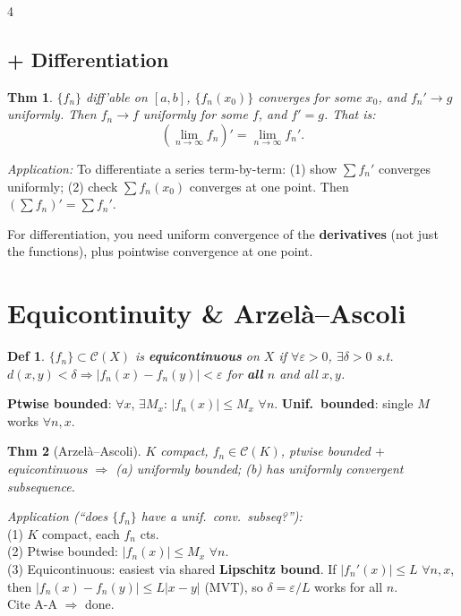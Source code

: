 \documentclass[9pt,landscape]{extarticle}
\newcommand{\eps}{\varepsilon}
\theoremstyle{compact}
\newtheorem*{thm}{Thm}
\theoremstyle{defnstyle}
\newtheorem*{defn}{Def}
\newenvironment{keyfact}{%
  \smallskip\noindent{\color{MidnightBlue}\bfseries Key:}\enspace\ignorespaces
}{\smallskip}
\begin{document}
\begin{multicols}{4}
\subsection{+ Differentiation}
\begin{thm}
$\{f_n\}$ diff'able on $[a,b]$, $\{f_n(x_0)\}$ converges for some $x_0$, and $f_n' \to g$ uniformly. Then $f_n \to f$ uniformly for some $f$, and $f' = g$. That is:
$$\left(\lim_{n\to\infty} f_n\right)' = \lim_{n\to\infty} f_n'.$$
\end{thm}
\textit{Application:} To differentiate a series term-by-term: (1) show $\sum f_n'$ converges uniformly; (2) check $\sum f_n(x_0)$ converges at one point. Then $(\sum f_n)' = \sum f_n'$.

\begin{keyfact}
For differentiation, you need uniform convergence of the \textbf{derivatives} (not just the functions), plus pointwise convergence at one point.
\end{keyfact}

\section{Equicontinuity \& Arzel\`a--Ascoli}

\begin{defn}
$\{f_n\} \subset \mathscr{C}(X)$ is \textbf{equicontinuous} on $X$ if $\forall \eps > 0$, $\exists \delta > 0$ s.t.\ $d(x,y) < \delta \Rightarrow |f_n(x) - f_n(y)| < \eps$ for \textbf{all} $n$ and all $x, y$.
\end{defn}

\textbf{Ptwise bounded}: $\forall x$, $\exists M_x$: $|f_n(x)| \leq M_x$ $\forall n$. \textbf{Unif.\ bounded}: single $M$ works $\forall n, x$.

\begin{highlight}
\begin{thm}[Arzel\`a--Ascoli]
$K$ compact, $f_n \in \mathscr{C}(K)$, ptwise bounded $+$ equicontinuous $\Rightarrow$ (a) uniformly bounded; (b) has uniformly convergent subsequence.
\end{thm}
\end{highlight}

\textit{Application (``does $\{f_n\}$ have a unif.\ conv.\ subseq?''):}\\
(1) $K$ compact, each $f_n$ cts.\\
(2) Ptwise bounded: $|f_n(x)|\leq M_x$ $\forall n$.\\
(3) Equicontinuous: easiest via shared \textbf{Lipschitz bound}. If $|f_n'(x)|\leq L$ $\forall n,x$, then $|f_n(x)-f_n(y)|\leq L|x-y|$ (MVT), so $\delta=\eps/L$ works for all $n$.\\
Cite A-A $\Rightarrow$ done.


\end{multicols}
\end{document}
